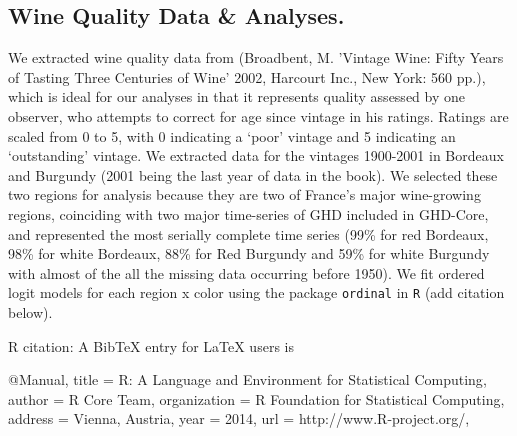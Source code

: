 \documentclass[final]{nature}
\begin{document}
\begin{methods}
\subsection{Wine Quality Data \& Analyses.}
We extracted wine quality data from (Broadbent, M. 'Vintage Wine: Fifty Years of Tasting Three Centuries of Wine' 2002, Harcourt Inc., New York: 560 pp.), which is ideal for our analyses in that it represents quality assessed by one observer, who attempts to correct for age since vintage in his ratings. Ratings are scaled from 0 to 5, with 0 indicating a `poor' vintage and 5 indicating an `outstanding' vintage. We extracted data for the vintages 1900-2001 in Bordeaux and Burgundy (2001 being the last year of data in the book). We selected these two regions for analysis because they are two of France's major wine-growing regions, coinciding with two major time-series of GHD included in GHD-Core, and represented the most serially complete time series (99\% for red Bordeaux, 98\% for white Bordeaux, 88\% for Red Burgundy and 59\% for white Burgundy with almost of the all the missing data occurring before 1950). We fit ordered logit models for each region x color using the package \verb|ordinal| in \verb|R| (add citation below).

R citation: A BibTeX entry for LaTeX users is

  @Manual{,
    title = {R: A Language and Environment for Statistical Computing},
    author = {{R Core Team}},
    organization = {R Foundation for Statistical Computing},
    address = {Vienna, Austria},
    year = {2014},
    url = {http://www.R-project.org/},
  }


\end{methods}



\end{document}

